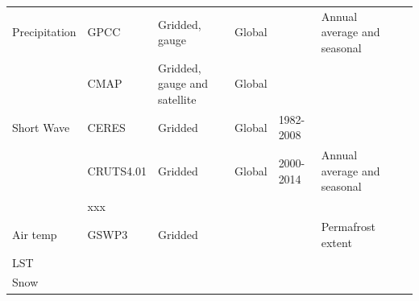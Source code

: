 \documentclass[bg, manuscript]{copernicus}
\begin{document}
\begin{table}
\begin{tabular}{lllllll}
\multirow{-3}{*}{Precipitation}    & GPCC                                   & Gridded, gauge               & Global          &                                                       & \multirow{-3}{*}{Annual average and seasonal}                        &                                                 \\
                                   & CMAP                                   & Gridded, gauge and satellite & Global          &                                                       &                                                                      &                                                 \\
Short Wave                         & CERES                                  & Gridded                      & Global          & 1982-2008                                             &                                                                      &                                                 \\
                                   & CRUTS4.01                              & Gridded                      & Global          & 2000-2014                                             & Annual average and seasonal                                          &                                                 \\
                                   & xxx                                    &                              &                 &                                                       &                                                                      &                                                 \\
\multirow{-3}{*}{Air temp}         & GSWP3                                  & Gridded                      &                 &                                                       & Permafrost extent                                                    &                                                 \\
LST                                &                                        &                              &                 &                                                       &                                                                      &                                                 \\
Snow                               &                                        &                              &                 &                                                       &                                                                      &                                                 \\

\end{tabular}
\end{table}
\end{document}
